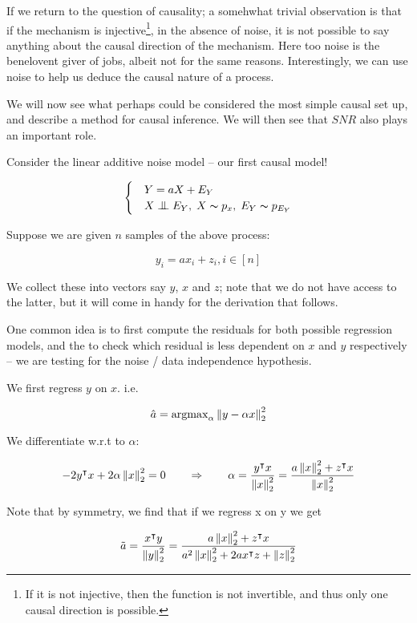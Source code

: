 If we return to the question of causality; a somehwhat trivial observation is that if the mechanism 
is injective\footnote{If it is not injective, then the function is not invertible, and thus only one 
causal direction is possible.}, in the absence of noise, it is 
not possible to say anything about the causal direction of the mechanism. Here too noise is the
benelovent giver of jobs, albeit not for the same reasons. Interestingly, we can use noise to 
help us deduce the causal nature of a process. 

We will now see what perhaps could be considered the most simple causal set up, and describe a method
for causal inference. We will then see that $SNR$ also plays an important role.

Consider the linear additive noise model -- our first causal model!

\[ \begin{cases} 
    & Y = aX + E_Y  \\
    & X \bigCI E_Y,\; X \thicksim p_x,\; E_Y \thicksim p_{E_Y}  
 \end{cases}
\]

Suppose we are given $n$ samples of the above process:

$$
    y_i = ax_i + z_i, i \in \left[n\right]
$$

We collect these into vectors say $y$, $x$ and $z$; note that we do not have
access to the latter, but it will come in handy for the derivation that follows.

One common idea is to first compute the residuals for both possible regression models,
and the to check which residual is less dependent on $x$ and $y$ respectively -- we are
testing for the noise / data independence hypothesis.

We first regress $y$ on $x$. i.e.

$$
    \hat{a} = \operatorname{argmax}_{\alpha} \left\lVert y - \alpha x\right\rVert_{2}^2
$$

We differentiate w.r.t to $\alpha$:

$$
    -2y^\intercal x + 2\alpha \left\lVert x\right\rVert_2^2 = 0 \qquad \Rightarrow \qquad 
    \alpha = \frac{y^\intercal x}{\left\lVert x\right\rVert_2^2} = 
    \frac{a\left\lVert x\right\rVert_2^2 + z^\intercal x}{\left\lVert x\right\rVert_2^2}
$$

Note that by symmetry, we find that if we regress x on y we get

$$
    \tilde{a} = \frac{x^\intercal y}{\left\lVert y\right\rVert_2^2} = 
    \frac{a\left\lVert x\right\rVert_2^2 + z^\intercal x}{a^2 \left\lVert x\right\rVert_2^2 + 2a x^\intercal z + \left\lVert z\right\rVert^2_2}
$$

